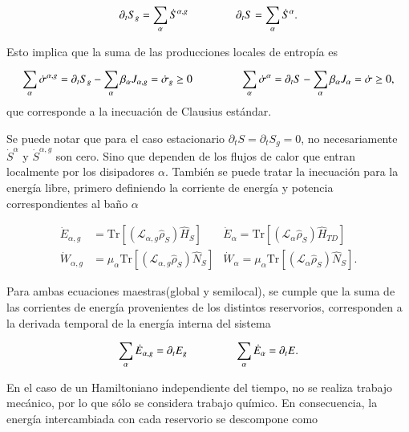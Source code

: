 \begin{equation*}
    \partial_t S_{g} = \sum_\alpha \dot{S}^{\alpha,g} \hspace{15mm}
    \partial_t S = \sum_\alpha \dot{S}^\alpha.
\end{equation*}    

Esto implica que la suma de las producciones locales de entropía es

\begin{equation*}
    \sum_{\alpha}\dot{\sigma}^{\alpha,g} = \partial_{t}S_{g} - \sum_{\alpha}\beta_{\alpha}J_{\alpha,g} = \dot{\sigma}_{g} \geq 0 \hspace{15mm}
    \sum_{\alpha}\dot{\sigma}^{\alpha} =\partial_{t}S  -\sum_{\alpha}\beta_{\alpha}J_{\alpha} = \dot{\sigma} \geq 0, 
\end{equation*}
que corresponde a la inecuación de Clausius estándar.

Se puede notar que para el caso estacionario $\partial_{t}S = \partial_{t}S_{g} = 0$, no necesariamente $\dot{S}^{\alpha}$ y $\dot{S}^{\alpha,g}$ son cero. Sino que dependen de los flujos de calor que entran localmente por los disipadores $\alpha$. También se puede tratar la inecuación para la energía libre, primero definiendo la corriente de energía y potencia correspondientes al baño $\alpha$

\begin{align*}
    \dot{E}_{\alpha,g} & = \text{Tr}[ (\mathcal{L}_{\alpha,g} \hat{\rho}_{S}) \hat{H}_{S}]   & \dot{E}_{\alpha} = \text{Tr}[ (\mathcal{L}_{\alpha} \hat{\rho}_{S}) \hat{H}_{TD}]   \\
    \dot{W}_{\alpha,g} & = \mu_{\alpha}\text{Tr}[ (\mathcal{L}_{\alpha,g} \hat{\rho}_{S}) \hat{N}_{S}] &  \dot{W}_{\alpha} = \mu_{\alpha}\text{Tr}[ (\mathcal{L}_{\alpha} \hat{\rho}_{S}) \hat{N}_{S}].
\end{align*}

Para ambas ecuaciones maestras(global y semilocal), se cumple que la suma de las corrientes de energía provenientes de los distintos reservorios, corresponden a la derivada temporal de la energía interna del sistema

\begin{equation*}
    \sum_{\alpha}\dot{E}_{\alpha,g} = \partial_{t}E_{g} \hspace{15mm} \sum_{\alpha}\dot{E}_{\alpha} = \partial_{t}E.
\end{equation*}

En el caso de un Hamiltoniano independiente del tiempo, no se realiza trabajo mecánico, por lo que sólo se considera trabajo químico. En consecuencia, la energía intercambiada con cada reservorio se descompone como

